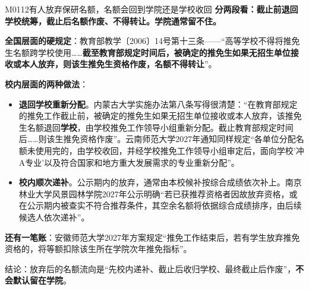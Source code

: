 \begin{qa}{M0112}{有人放弃保研名额，名额会回到学院还是学校收回}
\textbf{分两段看：截止前退回学校统筹，截止后名额作废、不得转让。学院通常留不住。}

\textbf{全国层面的硬规定}：教育部教学〔2006〕14号第十三条——“高等学校不得将推免生名额跨学校使用……\textbf{截至教育部规定时间后，被确定的推免生如果无招生单位接收或本人放弃，则该生推免生资格作废，名额不得转让}”。

\textbf{校内层面的两种做法}：
\begin{itemize}
  \item \textbf{退回学校重新分配}。内蒙古大学实施办法第八条写得很清楚：“在教育部规定的推免工作截止前，被确定的推免生如果无招生单位接收或本人放弃，该推免生名额退回\textbf{学校}，由学校推免工作领导小组重新分配。截止教育部规定时间后……则该生推免资格作废”。云南师范大学2027年通知同样规定“各单位分配名额未使用完的，由学校收回，并经学校推免工作领导小组审定后，面向学校'冲A专业'以及符合国家和地方重大发展需求的专业重新分配”。
  \item \textbf{校内顺次递补}。公示期内的放弃，通常由本校候补按综合成绩依次补上。南京林业大学风景园林学院2027年公示明确“若已获推荐资格者因故放弃资格，或在公示期内被查实不符合推荐条件，其空余名额将依据综合成绩排序，由后续候选人依次递补”。
\end{itemize}

\textbf{还有一笔账}：安徽师范大学2027年方案规定“推免工作结束后，若有学生放弃推免资格的，将等额扣除该生所在学院次年推免指标”。

结论：放弃后的名额流向是“先校内递补、截止后收归学校、最终截止后作废”，\textbf{不会默认留在学院}。
\end{qa}

